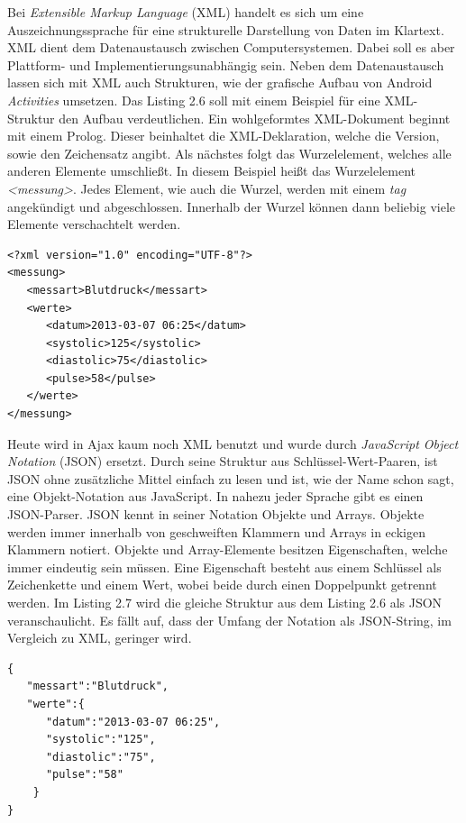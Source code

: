 Bei \emph{Extensible Markup Language}\cite{XML:01} (XML) handelt es sich um eine Auszeichnungssprache f\"ur eine strukturelle Darstellung von Daten im Klartext.
XML dient dem Datenaustausch zwischen Computersystemen. 
Dabei soll es aber Plattform- und Implementierungsunabh\"angig sein.
Neben dem Datenaustausch lassen sich mit XML auch Strukturen, wie der grafische Aufbau von Android \emph{Activities} umsetzen.
Das Listing 2.6 soll mit einem Beispiel f\"ur eine XML-Struktur den Aufbau verdeutlichen. 
Ein wohlgeformtes\cite{XML:02} XML-Dokument beginnt mit einem Prolog.
Dieser beinhaltet die XML-Deklaration, welche die Version, sowie den Zeichensatz angibt.
Als n\"achstes folgt das Wurzelelement, welches alle anderen Elemente umschlie\ss{}t.
In diesem Beispiel hei\ss{}t das Wurzelelement \emph{<messung>}.
Jedes Element, wie auch die Wurzel, werden mit einem \emph{tag} angek\"undigt und abgeschlossen.
Innerhalb der Wurzel k\"onnen dann beliebig viele Elemente verschachtelt werden.\\

\begin{lstlisting}[caption={Beispiel f\"ur eine Datenstruktur im XML}]
<?xml version="1.0" encoding="UTF-8"?>
<messung>
   <messart>Blutdruck</messart>
   <werte>
      <datum>2013-03-07 06:25</datum>
      <systolic>125</systolic>
      <diastolic>75</diastolic>
      <pulse>58</pulse>
   </werte>     
</messung>
\end{lstlisting}

Heute wird in Ajax kaum noch XML benutzt und wurde durch \emph{JavaScript Object Notation}\cite{JSON:01} (JSON) ersetzt.
Durch seine Struktur aus Schl\"ussel-Wert-Paaren, ist JSON ohne zus\"atzliche Mittel einfach zu lesen
und ist, wie der Name schon sagt, eine Objekt-Notation aus JavaScript.
In nahezu jeder Sprache gibt es einen JSON-Parser.
JSON kennt in seiner Notation Objekte und Arrays.
Objekte werden immer innerhalb von geschweiften Klammern und Arrays in eckigen Klammern notiert.
Objekte und Array-Elemente besitzen Eigenschaften, welche immer eindeutig sein m\"ussen.
Eine Eigenschaft besteht aus einem Schl\"ussel als Zeichenkette und einem Wert, wobei beide durch einen Doppelpunkt getrennt werden.
Im Listing 2.7 wird die gleiche Struktur aus dem Listing 2.6 als JSON veranschaulicht.
Es f\"allt auf, dass der Umfang der Notation als JSON-String, im Vergleich zu XML, geringer wird.\\


\begin{lstlisting}[caption={Beispiel aus Listing 2.6 umgesetzt in JSON}]
{
   "messart":"Blutdruck",
   "werte":{
      "datum":"2013-03-07 06:25",
      "systolic":"125",
      "diastolic":"75",
      "pulse":"58"
    }
}
\end{lstlisting}





